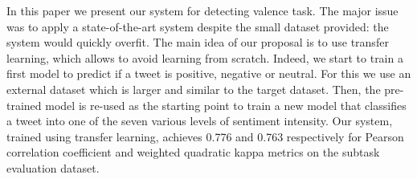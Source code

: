 In this paper we present our system for detecting valence task. The major issue was to apply a state-of-the-art system despite the small dataset provided: the system would quickly overfit. The main idea of our proposal is to use transfer learning, which allows to avoid learning from scratch. Indeed, we start to train a first model to predict if a tweet is positive, negative or neutral. For this we use an external dataset which is larger and similar to the target dataset. Then, the pre-trained model is re-used as the starting point to train a new model that classifies a tweet into one of the seven various levels of sentiment intensity. Our system, trained using transfer learning, achieves 0.776 and 0.763 respectively for Pearson correlation coefficient and weighted quadratic kappa metrics on the subtask evaluation dataset.

